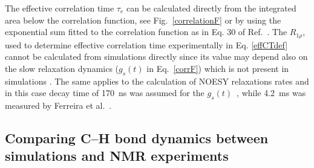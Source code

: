 \documentclass[aps,prl,superscriptaddress,twocolumn]{revtex4}
\begin{document}
The effective correlation time $\tau_e$ can be calculated directly from the integrated area below the correlation 
function, see Fig.~\ref{correlationF} or by using the exponential sum fitted to the correlation function as  
in Eq. 30 of Ref.~\cite{ferreira15}. The $R_{1\rho}$, used to determine effective correlation time experimentally 
in Eq. \ref{effCTdef} cannot be calculated from simulations directly since its value may depend
also on the slow relaxation dynamics ($g_s(t)$ in Eq.~\ref{corrF}) which is not present in simulations \cite{ferreira15}.
The same applies to the calculation of NOESY relaxations rates and in this case decay time of 170~ns was assumed for the
$g_s(t)$~\cite{feller99}, while 4.2~ms was measured by Ferreira et al.~\cite{ferreira15}.



\subsection{Comparing C--H bond dynamics between simulations and NMR experiments}
\end{document}
